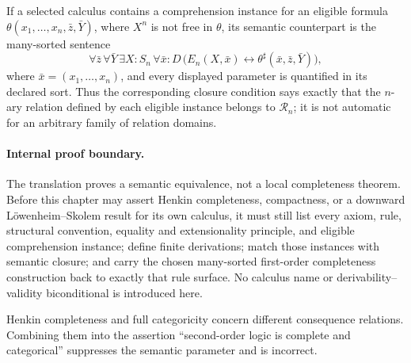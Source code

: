 If a selected calculus contains a comprehension instance for an eligible
formula \(\theta(x_1,\ldots,x_n,\bar z,\bar Y)\), where \(X^n\) is not free
in \(\theta\), its semantic counterpart is the many-sorted sentence
\[
  \forall\bar z\,\forall\bar Y\,
  \exists X{:}S_n\,\forall\bar x{:}D\,
  \bigl(E_n(X,\bar x)\leftrightarrow
        \theta^\sharp(\bar x,\bar z,\bar Y)\bigr),
\]
where \(\bar x=(x_1,\ldots,x_n)\), and every displayed parameter is quantified
in its declared sort.  Thus the corresponding closure condition says exactly
that the \(n\)-ary relation defined by each eligible instance belongs to
\(\mathcal R_n\); it is not automatic for an arbitrary family of relation
domains.

\paragraph{Internal proof boundary.}
The translation proves a semantic equivalence, not a local completeness
theorem.  Before this chapter may assert Henkin completeness, compactness, or a
downward L\"owenheim--Skolem result for its own calculus, it must still list
every axiom, rule, structural convention, equality and extensionality
principle, and eligible comprehension instance; define finite derivations;
match those instances with semantic closure; and carry the chosen many-sorted
first-order completeness construction back to exactly that rule surface.  No
calculus name or derivability--validity biconditional is introduced here.

Henkin completeness and full categoricity concern different consequence
relations.  Combining them into the assertion ``second-order logic is complete
and categorical'' suppresses the semantic parameter and is incorrect.

